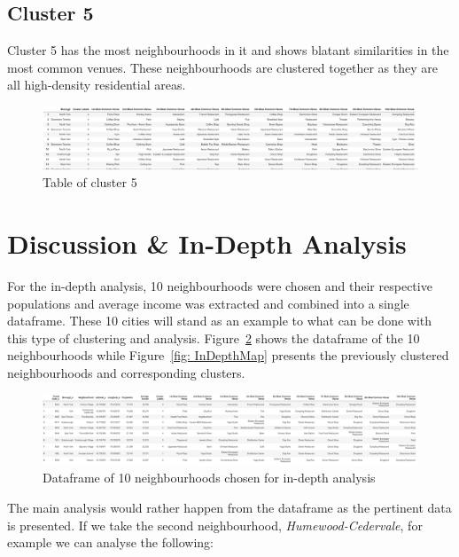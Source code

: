 \documentclass[12pt, conference]{IEEEtran}
\begin{document}
\subsection{Cluster 5}
Cluster 5 has the most neighbourhoods in it and shows blatant similarities in the most common venues. These neighbourhoods are clustered together as they are all high-density residential areas.
\begin{figure}[!h]
\center
\includegraphics[scale=0.4]{Cluster5}
\caption{Table of cluster 5}
\label{fig: Cluster5}
\end{figure}

\section{\textbf{Discussion \& In-Depth Analysis}}
\label{sec: In-Depth}
For the in-depth analysis, 10 neighbourhoods were chosen and their respective populations and average income was extracted and combined into a single dataframe. These 10 cities will stand as an example to what can be done with this type of clustering and analysis. Figure~\ref{fig: InDepthdf} shows the dataframe of the 10 neighbourhoods while Figure~\ref{fig: InDepthMap} presents the previously clustered neighbourhoods and corresponding clusters.

\begin{figure}[!h]
\center
\includegraphics[scale=0.35]{InDepthdf}
\caption{Dataframe of 10 neighbourhoods chosen for in-depth analysis}
\label{fig: InDepthdf}
\end{figure}

The main analysis would rather happen from the dataframe as the pertinent data is presented. If we take the second neighbourhood, \textit{Humewood-Cedervale}, for example we can analyse the following:
\end{document}
